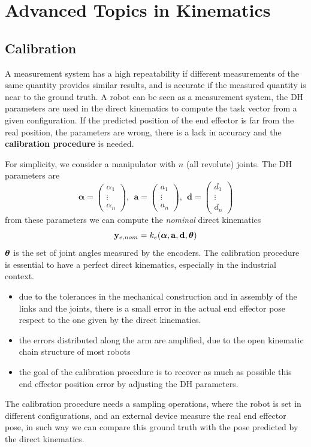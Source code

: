 \documentclass[10pt, a4paper]{report}
\begin{document}
\chapter{Advanced Topics in Kinematics}
\section{Calibration}
A measurement system has a high repeatability if different measurements of the same quantity provides similar results, and is accurate if the measured quantity is near to the ground truth. A robot can be seen as a measurement system, the DH parameters are used in the direct kinematics to compute the task vector from a given configuration. If the predicted position of the end effector is far from the real position, the parameters are wrong, there is a lack in accuracy and the \textbf{calibration procedure} is needed. 

For simplicity, we consider a manipulator with $n$ (all revolute) joints. The  DH parameters are\begin{equation}
    \boldsymbol{\alpha }= \begin{pmatrix}
        \alpha_1\\\vdots \\\alpha_n
    \end{pmatrix}, \ \ 
    \mathbf a=\begin{pmatrix}
        a_1\\\vdots \\a_n
    \end{pmatrix}, \ \ 
    \mathbf d=\begin{pmatrix}
        d_1\\\vdots \\d_n
    \end{pmatrix}
\end{equation}
from these parameters we can compute the \textit{nominal} direct kinematics\begin{equation}
    \mathbf y_{e,nom}=k_e(\boldsymbol\alpha,\mathbf a,\mathbf d,{\boldsymbol{\theta}})
\end{equation}
${\boldsymbol{\theta}}$ is the set of joint angles measured by the encoders. The calibration procedure is essential to have a perfect direct kinematics, especially in the industrial context. 
\begin{itemize}
    \item due to the tolerances in the mechanical construction and in assembly of the links and the joints, there is a small error in the actual end effector pose respect to the one given by the direct kinematics.
    \item the errors distributed along the arm are amplified,  due to
the open kinematic chain structure of most robots
    \item the goal of the calibration procedure is to recover as much as possible this end effector position error by adjusting the DH parameters.
\end{itemize}
The calibration procedure needs a sampling operations, where the robot is set in different configurations, and an external device measure the real end effector pose, in such way we can compare this ground truth with the pose predicted by the direct kinematics.
\end{document}
